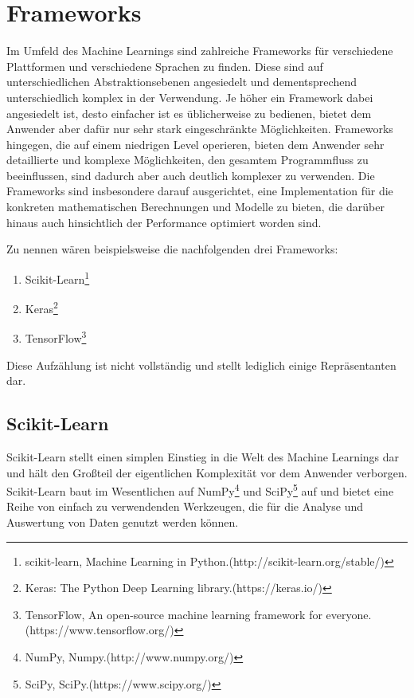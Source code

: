 \section{Frameworks}

Im Umfeld des Machine Learnings sind zahlreiche Frameworks für verschiedene Plattformen und verschiedene Sprachen zu
finden. Diese sind auf unterschiedlichen Abstraktionsebenen angesiedelt und dementsprechend unterschiedlich komplex
in der Verwendung.
Je höher ein Framework dabei angesiedelt ist, desto einfacher ist es üblicherweise zu bedienen, bietet dem Anwender aber
dafür nur sehr stark eingeschränkte Möglichkeiten. Frameworks hingegen, die auf einem niedrigen Level operieren, bieten
dem Anwender sehr detaillierte und komplexe Möglichkeiten, den gesamtem Programmfluss zu beeinflussen, sind dadurch aber
auch deutlich komplexer zu verwenden.
Die Frameworks sind insbesondere darauf ausgerichtet, eine Implementation für die konkreten mathematischen Berechnungen
und Modelle zu bieten, die darüber hinaus auch hinsichtlich der Performance optimiert worden sind.

Zu nennen wären beispielsweise die nachfolgenden drei Frameworks:

\begin{enumerate}
    \item{Scikit-Learn\footnote{scikit-learn, Machine Learning in Python.\newline(http://scikit-learn.org/stable/)}}
    \item{Keras\footnote{Keras: The Python Deep Learning library.\newline(https://keras.io/)}}
    \item{TensorFlow\footnote{TensorFlow\texttrademark, An open-source machine learning framework for everyone.\newline(https://www.tensorflow.org/)}}
\end{enumerate}

Diese Aufzählung ist nicht vollständig und stellt lediglich einige Repräsentanten dar.

\subsection{Scikit-Learn}

Scikit-Learn stellt einen simplen Einstieg in die Welt des Machine Learnings dar und hält den Großteil der eigentlichen
Komplexität vor dem Anwender verborgen. Scikit-Learn baut im Wesentlichen auf NumPy\footnote{NumPy, Numpy.\newline(http://www.numpy.org/)} und
SciPy\footnote{SciPy, SciPy.\newline(https://www.scipy.org/)} auf und bietet eine Reihe von einfach zu verwendenden Werkzeugen, die für die Analyse und
Auswertung von Daten genutzt werden können.

